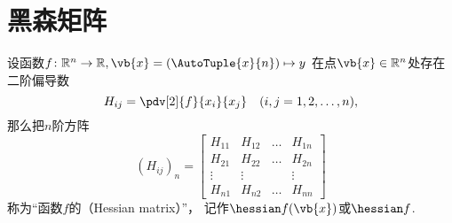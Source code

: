 \section{黑森矩阵}
\begin{definition}
设函数\(f\colon\mathbb{R}^n\to\mathbb{R}, \vb{x}=(\AutoTuple{x}{n}) \mapsto y\)
在点\(\vb{x} \in \mathbb{R}^n\)处存在二阶偏导数\begin{equation*}
	H_{ij} = \pdv[2]{f}{x_i}{x_j}
	\quad(i,j=1,2,\dotsc,n),
\end{equation*}
那么把\(n\)阶方阵\begin{equation*}
	(H_{ij})_n
	= \begin{bmatrix}
		H_{11} & H_{12} & \dots & H_{1n} \\
		H_{21} & H_{22} & \dots & H_{2n} \\
		\vdots & \vdots & & \vdots \\
		H_{n1} & H_{n2} & \dots & H_{nn}
	\end{bmatrix}
\end{equation*}称为“函数\(f\)的（Hessian matrix）”，
记作\(\hessian f(\vb{x})\)或\(\hessian f\).
\end{definition}
